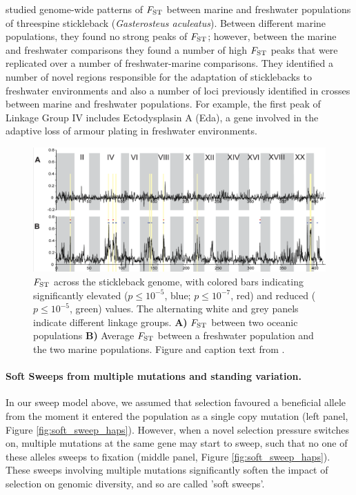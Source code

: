 \citet{hohenlohe2010population} studied genome-wide patterns of
$F_{\mathrm{ST}}$ between marine and freshwater populations of  threespine
stickleback ({\it Gasterosteus aculeatus}). 
Between different marine populations, they found no strong peaks of $F_{\mathrm{ST}}$;
however, between the marine and freshwater comparisons they found a
number of high $F_{\mathrm{ST}}$  peaks that were replicated over a number of
freshwater-marine comparisons. They identified a number of novel
regions responsible for the adaptation of sticklebacks to freshwater
environments and also a number of loci previously identified in crosses between marine and freshwater populations. For example, the first peak of Linkage
Group IV includes Ectodysplasin A (Eda), a gene involved in the adaptive loss of armour plating in freshwater environments.
\begin{figure}
\begin{center}
\includegraphics[width=0.9 \textwidth]{Journal_figs/recom_selection/Stickleback_FST/hohenlohe.png}
\end{center}
\caption{$F_{\mathrm{ST}}$ across the stickleback genome, with colored bars indicating
  significantly elevated ($p \leq 10^{−5}$, blue; $p \leq 10^{−7}$,
  red) and reduced ($p \leq 10^{−5}$, green) values. The alternating
  white and grey panels indicate different linkage groups. {\bf A)} $F_{\mathrm{ST}}$
  between two oceanic populations {\bf B)} Average $F_{\mathrm{ST}}$ between a
  freshwater population and the two marine populations. Figure and
  caption text from \citet{hohenlohe2010population}.} \label{fig:local_sweep_haps}
\end{figure}


\paragraph{Soft Sweeps from multiple mutations and standing variation.}
In our sweep model above, we assumed that selection favoured a
beneficial allele from the moment it entered the population as a
single copy mutation  (left panel, Figure \ref{fig:soft_sweep_haps}). However, when a novel selection pressure
switches on, multiple mutations at the same gene
may start to sweep, such that no one of these alleles sweeps
to fixation (middle panel, Figure \ref{fig:soft_sweep_haps}). These sweeps involving multiple mutations significantly
soften the impact of selection on genomic diversity, and so are called 'soft sweeps'.


